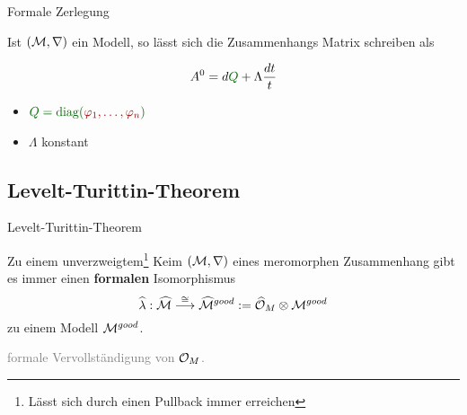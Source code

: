 \begin{frame}[t]{Formale Zerlegung}
  \begin{lem}
    Ist $(\mathcal{M},\nabla)$ ein Modell, so lässt sich die Zusammenhangs Matrix
    schreiben als
    \begin{multicols}{2}
      \[
        A^0=d\overset{~\tikzmark{e1}}{\textcolor{green!40!black}{Q}}
           +~\tikzmark{e2}\!\!\Lambda\frac{dt}{t}
      \]
      \columnbreak
      \begin{itemize}
        \item[\tikzmarkb{n1}{green}]
          $\textcolor{green!40!black}{Q
            =\diag(\textcolor{red!60!black}{\phi_1,\dots,\phi_n})}$
        \item[\tikzmarkc{n2}{blue}]
          $\Lambda$ konstant
      \end{itemize}
    \end{multicols}
  \end{lem}
  \vfill
  \vfill
\end{frame}
\subsection{Levelt-Turittin-Theorem}
\begin{frame}{Levelt-Turittin-Theorem}
  \begin{tthm}
    Zu einem unverzweigtem\footnote{Lässt sich durch einen Pullback immer
    erreichen} Keim $(\mathcal{M},\nabla)$ eines meromorphen Zusammenhang gibt es immer
    einen \textbf{formalen} Isomorphismus
    \[
      \hat\lambda:\hat\cM
      \overset{\cong}\longrightarrow
      \hat\cM^{good}:=~\tikzmark{e1}\!\!\hat\cO_M\otimes\cM^{good}
    \]
    zu einem Modell $\mathcal{M}^{good}$.
  \end{tthm}
  \begin{flushright}
    \textcolor{gray}{formale Vervollständigung von $\mathcal{O}_M$.}
  \end{flushright}
\end{frame}

